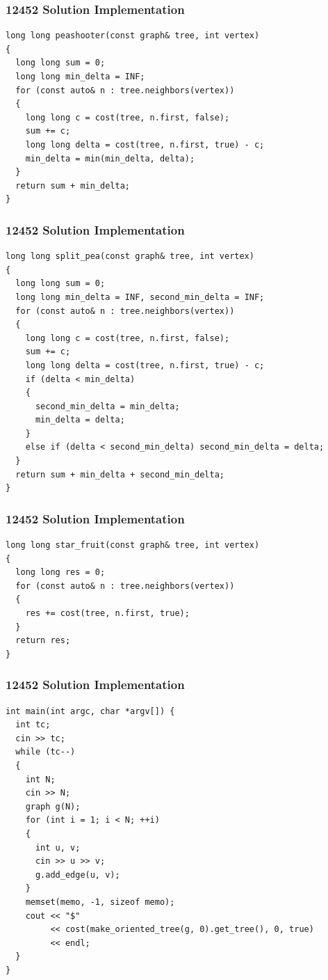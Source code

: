 \documentclass{beamer}
\begin{document}
\begin{frame}[fragile]
\frametitle{12452 Solution Implementation}

\scriptsize
\begin{lstlisting}
long long peashooter(const graph& tree, int vertex)
{
  long long sum = 0;
  long long min_delta = INF;
  for (const auto& n : tree.neighbors(vertex))
  {
    long long c = cost(tree, n.first, false);
    sum += c;
    long long delta = cost(tree, n.first, true) - c;
    min_delta = min(min_delta, delta);
  }
  return sum + min_delta;
}
\end{lstlisting}

\end{frame}

\begin{frame}[fragile]
\frametitle{12452 Solution Implementation}

\scriptsize
\begin{lstlisting}
long long split_pea(const graph& tree, int vertex)
{
  long long sum = 0;
  long long min_delta = INF, second_min_delta = INF;
  for (const auto& n : tree.neighbors(vertex))
  {
    long long c = cost(tree, n.first, false);
    sum += c;
    long long delta = cost(tree, n.first, true) - c;
    if (delta < min_delta)
    {
      second_min_delta = min_delta;
      min_delta = delta;
    }
    else if (delta < second_min_delta) second_min_delta = delta;
  }
  return sum + min_delta + second_min_delta;
}
\end{lstlisting}

\end{frame}

\begin{frame}[fragile]
\frametitle{12452 Solution Implementation}

\scriptsize
\begin{lstlisting}
long long star_fruit(const graph& tree, int vertex)
{
  long long res = 0;
  for (const auto& n : tree.neighbors(vertex))
  {
    res += cost(tree, n.first, true);
  }
  return res;
}
\end{lstlisting}

\end{frame}

\begin{frame}[fragile]
\frametitle{12452 Solution Implementation}

\scriptsize
\begin{lstlisting}
int main(int argc, char *argv[]) {
  int tc;
  cin >> tc;
  while (tc--)
  {
    int N;
    cin >> N;
    graph g(N);
    for (int i = 1; i < N; ++i)
    {
      int u, v;
      cin >> u >> v;
      g.add_edge(u, v);
    }
    memset(memo, -1, sizeof memo);
    cout << "$"
         << cost(make_oriented_tree(g, 0).get_tree(), 0, true)
         << endl;
  }
}
\end{lstlisting}

\end{frame}
\end{document}

